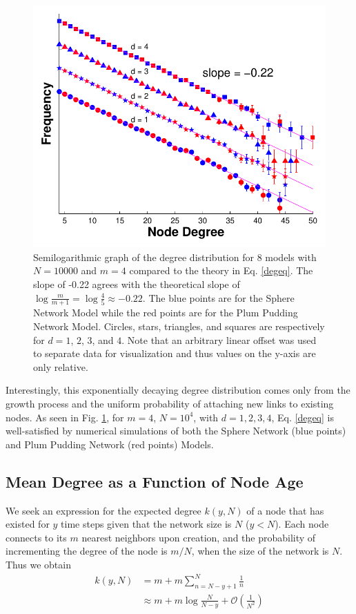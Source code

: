 \documentclass[aps,pre,reprint,superscriptaddress,amsmath,amssymb,nofootinbib]{revtex4-1}
\begin{document}
\begin{figure}
\includegraphics[width=\linewidth]{figures/figDegDist.pdf}
\caption{\label{degdist}Semilogarithmic graph of the degree distribution for 8 models with $N = 10000$ and $m = 4$ compared to the theory in Eq. \eqref{degeq}. The slope of -0.22 agrees with the theoretical slope of $\log \frac{m}{m+1} = \log \frac{4}{5} \approx -0.22$. The blue points are for the Sphere Network Model while the red points are for the Plum Pudding Network Model. Circles, stars, triangles, and squares are respectively for $d=1$, $2$, $3$, and $4$. Note that an arbitrary linear offset was used to separate data for visualization and thus values on the y-axis are only relative.}
\end{figure}

Interestingly, this exponentially decaying degree distribution comes only from the growth process and the uniform probability of attaching new links to existing nodes.  
As seen in Fig. \ref{degdist}, for $m = 4$, $N = 10^4$, with $d = 1,2,3,4$, Eq. \eqref{degeq} is well-satisfied by numerical simulations of both the Sphere Network (blue points) and Plum Pudding Network (red points) Models.

\subsection{Mean Degree as a Function of Node Age}
We seek an expression for the expected degree $k(y,N)$ of a node that has existed for $y$ time steps given that the network size is $N$ ($y < N$).
Each node connects to its $m$ nearest neighbors upon creation, and the probability of incrementing the degree of the node is $m/N$, when the size of the network is $N$.
Thus we obtain 
\begin{equation}\label{ageeq}
\begin{split}
k(y,N)& = m + m\sum_{n=N-y+1}^{N} \frac{1}{n}\\
      & \approx m + m \log \frac{N}{N-y} + \mathcal O\left(\frac{1}{N^2}\right)
\end{split}
\end{equation}
 
\end{document}
